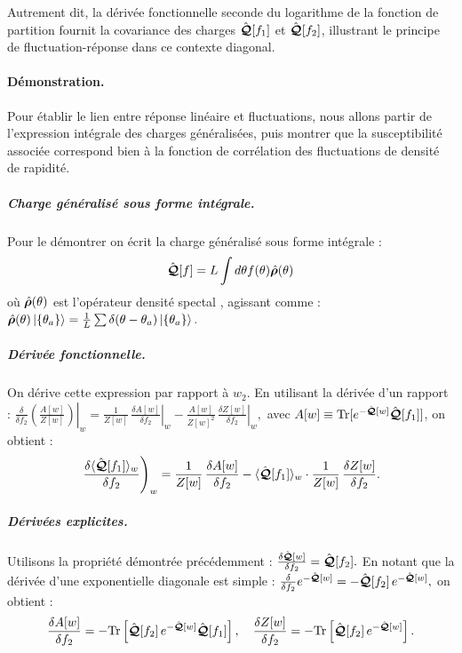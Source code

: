 Autrement dit, la dérivée fonctionnelle seconde du logarithme de la fonction de partition fournit la covariance des charges \( \hat{\bm{\mathcal{Q}}}[f_1] \) et \( \hat{\bm{\mathcal{Q}}}[f_2] \), illustrant le principe de fluctuation-réponse dans ce contexte diagonal.

\paragraph{Démonstration.}

Pour établir le lien entre réponse linéaire et fluctuations, nous allons partir de l'expression intégrale des charges généralisées, puis montrer que la susceptibilité associée correspond bien à la fonction de corrélation des fluctuations de densité de rapidité.


\subparagraph{Charge généralisé sous forme intégrale.}
Pour le démontrer on écrit la charge généralisé sous forme intégrale : 
\begin{eqnarray*}
\hat{\bm{\mathcal{Q}}}[f] = L\int d\theta f(\theta) \hat{\bm{\rho}}(\theta)
\end{eqnarray*}
où $\hat{\bm{\rho}}(\theta)$ est l'opérateur densité spectal , agissant comme :
\(
\hat{\bm{\rho}}(\theta) \ket{ \{ \theta_a \} } = \frac{1}{L} \sum \delta ( \theta - \theta_a ) \ket{ \{ \theta_a \} }.
\)

\subparagraph{Dérivée fonctionnelle.}
On dérive cette expression par rapport à $w_2$. En utilisant la dérivée d’un rapport :
\(
	\left.\frac{\delta}{\delta f_2} \left( \frac{A[w]}{Z[w]} \right) \right |_{w} = \frac{1}{Z[w]}\, \left.\frac{\delta A[w]}{\delta f_2} \right|_{w} - \frac{A[w]}{Z[w]^2}\, \left.\frac{\delta Z[w]}{\delta f_2}\right|_{w} ,
\)
avec $A[w] \equiv \mathrm{Tr}[e^{-\hat{\bm{\mathcal{Q}}}[w]} \hat{\bm{\mathcal{Q}}}[f_1]]$, on obtient :
\begin{eqnarray*}
	\left . \frac{\delta \langle \hat{\bm{\mathcal{Q}}}[f_1] \rangle_w}{\delta f_2} \right )_w
	= \frac{1}{Z[w]}\, \frac{\delta A[w]}{\delta f_2}
	- \langle \hat{\bm{\mathcal{Q}}}[f_1] \rangle_w \cdot \frac{1}{Z[w]}\, \frac{\delta Z[w]}{\delta f_2}.
\end{eqnarray*}

\subparagraph{Dérivées explicites.}
Utilisons la propriété démontrée précédemment :
\(
	\frac{\delta \hat{\bm{\mathcal{Q}}}[w]}{\delta f_2} = \hat{\bm{\mathcal{Q}}}[f_2]	.
\)
En notant que la dérivée d’une exponentielle diagonale est simple :
\(
\frac{\delta}{\delta f_2} e^{-\hat{\bm{\mathcal{Q}}}[w]} = - \hat{\bm{\mathcal{Q}}}[f_2]\, e^{-\hat{\bm{\mathcal{Q}}}[w]},
\)
on obtient :
\begin{eqnarray*}
\frac{\delta A[w]}{\delta f_2} = - \mathrm{Tr}\left[ \hat{\bm{\mathcal{Q}}}[f_2]\, e^{-\hat{\bm{\mathcal{Q}}}[w]} \hat{\bm{\mathcal{Q}}}[f_1] \right],
\quad
\frac{\delta Z[w]}{\delta f_2} = - \mathrm{Tr}\left[ \hat{\bm{\mathcal{Q}}}[f_2]\, e^{-\hat{\bm{\mathcal{Q}}}[w]} \right].
\end{eqnarray*}

